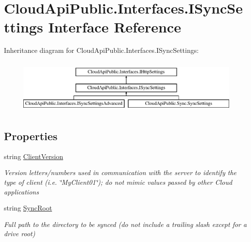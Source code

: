 \hypertarget{interface_cloud_api_public_1_1_interfaces_1_1_i_sync_settings}{\section{Cloud\-Api\-Public.\-Interfaces.\-I\-Sync\-Settings Interface Reference}
\label{interface_cloud_api_public_1_1_interfaces_1_1_i_sync_settings}
}
Inheritance diagram for Cloud\-Api\-Public.\-Interfaces.\-I\-Sync\-Settings\-:\begin{figure}[H]
\begin{center}
\leavevmode
\includegraphics[height=2.754098cm]{interface_cloud_api_public_1_1_interfaces_1_1_i_sync_settings}
\end{center}
\end{figure}
\subsection*{Properties}
\begin{DoxyCompactItemize}
\item 
string \hyperlink{interface_cloud_api_public_1_1_interfaces_1_1_i_sync_settings_a10e2af418073326f5ff218b13faee6c6}{Client\-Version}
\begin{DoxyCompactList}\small\item\em Version letters/numbers used in communication with the server to identify the type of client (i.\-e. \char`\"{}\-My\-Client01\char`\"{}); do not mimic values passed by other Cloud applications \end{DoxyCompactList}\item 
string \hyperlink{interface_cloud_api_public_1_1_interfaces_1_1_i_sync_settings_a662415673548d8374f63b50d5e58b8ba}{Sync\-Root}
\begin{DoxyCompactList}\small\item\em Full path to the directory to be synced (do not include a trailing slash except for a drive root) \end{DoxyCompactList}\end{DoxyCompactItemize}


